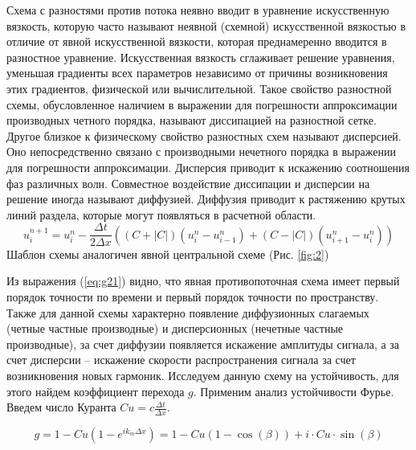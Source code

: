 Схема с разностями против потока неявно вводит в уравнение искусственную вязкость, которую часто
называют неявной (схемной) искусственной вязкостью в отличие
от явной искусственной вязкости, которая преднамеренно вводится в разностное уравнение. Искусственная вязкость сглаживает
решение уравнения, уменьшая градиенты всех параметров независимо от причины возникновения этих градиентов, физической или вычислительной. Такое свойство разностной схемы, обусловленное наличием в выражении для погрешности аппроксимации производных четного порядка, называют диссипацией на разностной
сетке.
Другое близкое к физическому свойство разностных схем называют дисперсией. Оно непосредственно связано с производными
нечетного порядка в выражении для погрешности аппроксимации.
Дисперсия приводит к искажению соотношения фаз различных
волн. Совместное воздействие диссипации и дисперсии на решение иногда называют диффузией. Диффузия приводит к растяжению крутых линий раздела, которые могут появляться в расчетной
области.
\begin{equation}
    u_i^{n+1}=u_i^n-\frac{\Delta t}{2 \Delta x} ((C+|C|)(u_i^n-u_{i-1}^n)+(C-|C|)(u_{i+1}^n-u_i^n))
    \label{eq:g21}
\end{equation}
Шаблон схемы аналогичен явной центральной схеме (Рис. \ref{fig:2})

Из выражения (\ref{eq:g21}) видно, что явная противопоточная схема имеет первый порядок точности по времени и первый порядок точности по пространству. Также для данной схемы характерно появление диффузионных слагаемых (четные частные производные) и дисперсионных (нечетные частные производные), за счет диффузии появляется искажение амплитуды сигнала, а за счет дисперсии – искажение скорости распространения сигнала за счет возникновения новых гармоник.
Исследуем данную схему на устойчивость, для этого найдем коэффициент перехода $g$. Применим анализ устойчивости Фурье. Введем число Куранта $Cu=c\frac{\Delta t}{\Delta x}$.

\begin{equation}
    g=1-Cu (1-e^{ik_m\Delta x})=1-Cu(1-\cos(\beta))+i\cdot Cu \cdot \sin(\beta)
\end{equation}

